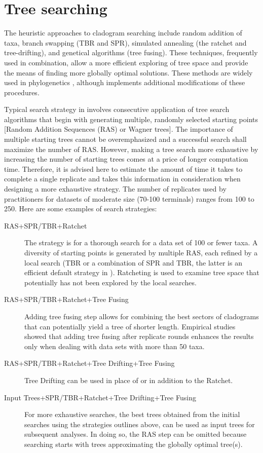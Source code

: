 \section{Tree searching}
The heuristic approaches to cladogram searching include random addition of taxa, branch swapping (TBR and SPR), simulated annealing (the ratchet and tree-drifting), and genetical algorithms (tree fusing). These techniques, frequently used in combination, allow a more efficient exploring of tree space and provide the means of finding more globally optimal solutions. These methods are widely used in phylogenetics \cite{felsenstein2004a, wheeleretal2006}, although \poy implements additional modifications of these procedures.

Typical search strategy in \poy involves consecutive application of tree search algorithms that begin with generating multiple, randomly selected starting points [Random Addition Sequences (RAS) or Wagner trees]. The importance of multiple starting trees cannot be overemphasized and a successful search shall maximize the number of RAS. However, making a tree search more exhaustive by increasing the number of starting trees comes at a price of longer computation time. Therefore, it is advised here to estimate the amount of time it takes to complete a single replicate and takes this information in consideration when designing a more exhaustive strategy. The  number of replicates used by \poy practitioners for datasets of moderate size (70-100 terminals) ranges from 100 to 250. Here are some examples of search strategies:
\begin{description}
\item[RAS+SPR/TBR+Ratchet] The strategy is for a thorough search for a data set of 100 or fewer taxa. A diversity of starting points is generated by multiple RAS, each refined by a local search (TBR or a combination of SPR and TBR, the latter is an efficient default strategy in \poy). Ratcheting is used to examine tree space that potentially has not been explored by the local searches.
\item[RAS+SPR/TBR+Ratchet+Tree Fusing]  Adding tree fusing step allows for combining the best sectors of cladograms that can potentially yield a tree of shorter length. Empirical studies showed that adding tree fusing after replicate rounds enhances the results only when dealing with data sets with more than 50 taxa.
\item[RAS+SPR/TBR+Ratchet+Tree Drifting+Tree Fusing] Tree Drifting can be used in place of or in addition to the Ratchet.
\item[Input Trees+SPR/TBR+Ratchet+Tree Drifting+Tree Fusing] For more exhaustive searches, the best trees obtained from the initial searches using the strategies outlines above, can be used as input trees for subsequent analyses. In doing so, the RAS step can be omitted because searching starts with trees approximating the globally optimal tree(s).
\end{description}

